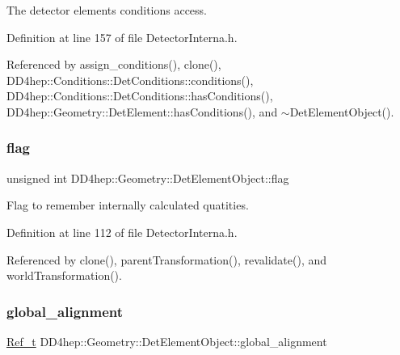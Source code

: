 The detector elements conditions access. 



Definition at line 157 of file Detector\+Interna.\+h.



Referenced by assign\+\_\+conditions(), clone(), D\+D4hep\+::\+Conditions\+::\+Det\+Conditions\+::conditions(), D\+D4hep\+::\+Conditions\+::\+Det\+Conditions\+::has\+Conditions(), D\+D4hep\+::\+Geometry\+::\+Det\+Element\+::has\+Conditions(), and $\sim$\+Det\+Element\+Object().

\hypertarget{class_d_d4hep_1_1_geometry_1_1_det_element_object_abcab90748d7423310fbf73fcc54cef47}{}\label{class_d_d4hep_1_1_geometry_1_1_det_element_object_abcab90748d7423310fbf73fcc54cef47} 
\subsubsection{\texorpdfstring{flag}{flag}}
{\footnotesize\ttfamily unsigned int D\+D4hep\+::\+Geometry\+::\+Det\+Element\+Object\+::flag}



Flag to remember internally calculated quatities. 



Definition at line 112 of file Detector\+Interna.\+h.



Referenced by clone(), parent\+Transformation(), revalidate(), and world\+Transformation().

\hypertarget{class_d_d4hep_1_1_geometry_1_1_det_element_object_a5f3e0ea44d06a48a4ba4525754f6ef03}{}\label{class_d_d4hep_1_1_geometry_1_1_det_element_object_a5f3e0ea44d06a48a4ba4525754f6ef03} 
\subsubsection{\texorpdfstring{global\+\_\+alignment}{global\_alignment}}
{\footnotesize\ttfamily \hyperlink{group___d_d4_h_e_p___g_e_o_m_e_t_r_y_ga40af83be6718bb8828a3d83dc7f8c930}{Ref\+\_\+t} D\+D4hep\+::\+Geometry\+::\+Det\+Element\+Object\+::global\+\_\+alignment}



